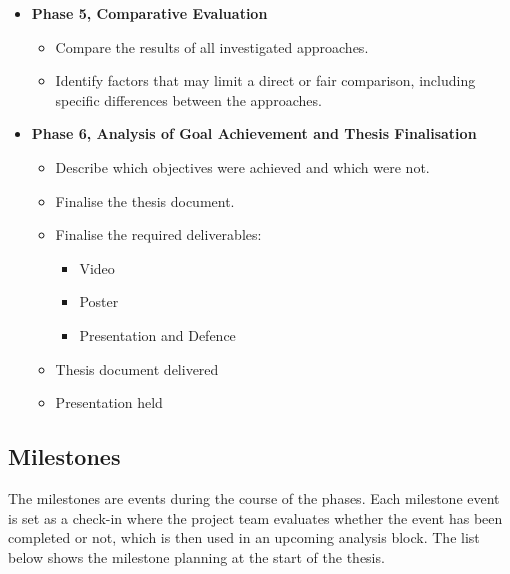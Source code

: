 \begin{itemize}
    \item \textbf{Phase 5, Comparative Evaluation}
    \begin{itemize}
        \item Compare the results of all investigated approaches.
        \item Identify factors that may limit a direct or fair comparison,
              including specific differences between the approaches.
    \end{itemize}

    \item \textbf{Phase 6, Analysis of Goal Achievement and Thesis Finalisation}
    \begin{itemize}
        \item Describe which objectives were achieved and which were not.
        \item Finalise the thesis document.
        \item Finalise the required deliverables:
        \begin{itemize}
            \item Video
            \item Poster
            \item Presentation and Defence
        \end{itemize}
        \item Thesis document delivered
        \item Presentation held
    \end{itemize}

\end{itemize}




\subsection*{Milestones}
\label{ProjMgmtMilestones}


The milestones are events during the course of the phases. Each milestone event is set as a check-in where the project team evaluates whether the event has been completed or not, which is then used in an upcoming analysis block. The list below shows the milestone planning at the start of the thesis.


